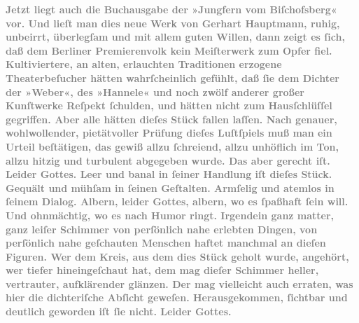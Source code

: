            \textcolor{gray}{\textbf{Jetzt liegt auch die Buchausgabe der »Jungfern vom Biſchofsberg« vor. Und lieſt man dies neue
                  Werk von Gerhart Hauptmann, ruhig,
                  unbeirrt, überlegſam und mit allem guten Willen, dann zeigt es{ }ſich, daß dem Berliner Premierenvolk kein Meiſterwerk zum
                  Opfer fiel. Kultiviertere, an alten, erlauchten Traditionen erzogene
                  Theaterbeſucher hätten wahrſcheinlich gefühlt, daß{ }ſie dem Dichter der »Weber«, des »Hannele« und noch zwölf anderer großer Kunſtwerke Reſpekt{ }ſchulden, und
                  hätten nicht zum Hausſchlüſſel gegriffen. Aber alle hätten dieſes Stück fallen laſſen. Nach genauer,
                  wohlwollender, pietätvoller Prüfung dieſes Luſtſpiels muß man ein Urteil
                  beſtätigen, das gewiß allzu{ }ſchreiend, allzu unhöflich im Ton, allzu hitzig und
                  turbulent abgegeben wurde. Das aber gerecht iſt. Leider Gottes. Leer und banal in{ }ſeiner Handlung iſt dieſes Stück. Gequält und mühſam in{ }ſeinen Geſtalten. Armſelig
                  und atemlos in{ }ſeinem Dialog. Albern, leider Gottes, albern, wo es{ }ſpaßhaft{ }ſein
                  will. Und ohnmächtig, wo es nach Humor ringt. Irgendein ganz matter, ganz leiſer
                  Schimmer von perſönlich nahe erlebten Dingen, von perſönlich nahe geſchauten
                  Menschen haftet manchmal an dieſen Figuren. Wer dem Kreis, aus dem dies Stück
                  geholt wurde, angehört, wer tiefer hineingeſchaut hat, dem mag dieſer Schimmer
                  heller, vertrauter, aufklärender glänzen. Der mag vielleicht auch erraten, was
                  hier die dichteriſche Abſicht geweſen. Herausgekommen,{ }ſichtbar und deutlich
                  geworden iſt{ }ſie nicht. Leider Gottes.}}\pend
           
